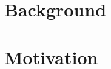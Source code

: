 \documentclass[senior,final,11pt]{iscs-thesis}
\begin{document}
\section{Background}



\section{Motivation}

\end{document}
